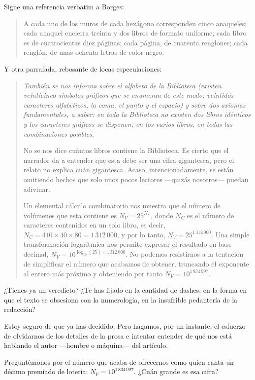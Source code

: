 \documentclass[11pt,a4paper]{article}
\begin{document}
Sigue una referencia verbatim a Borges:

\begin{quotation}
A cada uno de los muros de cada hexágono corresponden cinco anaqueles; cada anaquel encierra treinta y dos libros de formato uniforme; cada libro es de cuatrocientas diez páginas; cada página, de cuarenta renglones; cada renglón, de unas ochenta letras de color negro.
\end{quotation}

Y otra parrafada, rebosante de locas especulaciones:

\begin{quotation}\itshape
También se nos informa sobre el alfabeto de la Biblioteca (existen veinticinco símbolos gráficos que se enumeran de este modo: veintidós caracteres alfabéticos, la coma, el punto y el espacio) y sobre dos axiomas fundamentales, a saber: en toda la Biblioteca no existen dos libros idénticos y los caracteres gráficos se disponen, en los varios libros, en todas las combinaciones posibles.

No se nos dice cuántos libros contiene la Biblioteca. Es cierto que el narrador da a entender que esta debe ser una cifra gigantesca, pero el relato no explica cuán gigantesca. Acaso, intencionadamente, se están omitiendo hechos que solo unos pocos lectores ---quizás nosotros--- puedan adivinar.

Un elemental cálculo combinatorio nos muestra que el número de volúmenes que esta contiene es $N_V = 25^{N_C}$, donde $N_C$ es el número de caracteres contenidos en un solo libro, es decir, $N_C = 410\times 40\times 80 = 1\,312\,000$, y por lo tanto, $N_V = 25^{1\,312\,000}$. Una simple transformación logarítmica nos permite expresar el resultado en base decimal, $N_V = 10^{\log_{10}(25)\times 1\,312\,000}$. No podemos resistirnos a la tentación de simplificar el número que acabamos de obtener, truncando el exponente al entero más próximo y obteniendo por tanto $N_V = 10^{1\,834\,097}$.
\end{quotation}

¿Tienes ya un veredicto? ¿Te has fijado en la cantidad de dashes, en la forma en que el texto se obsesiona con la numerología, en la insufrible pedantería de la redacción?

Estoy seguro de que ya has decidido. Pero hagamos, por un instante, el esfuerzo de olvidarnos de los detalles de la prosa e intentar entender de qué nos está hablando el autor ---hombre o máquina--- del artículo.

Preguntémonos por el número que acaba de ofrecernos como quien canta un décimo premiado de lotería: $N_V = 10^{1\,834\,097}$. ¿Cuán grande es esa cifra?
\end{document}

